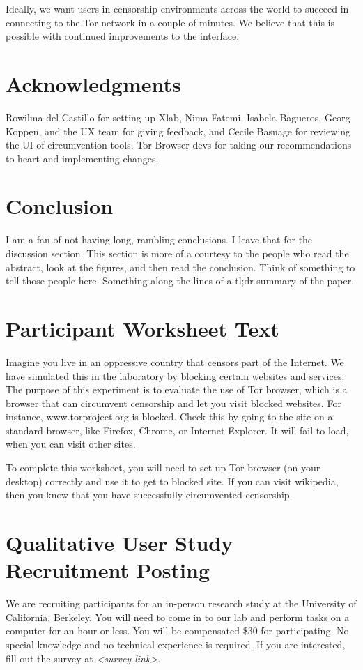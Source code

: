 \documentclass[USenglish,oneside,twocolumn]{article}
\begin{document}
Ideally, we want users in censorship environments across the world to succeed in connecting to the Tor network in a couple of minutes. We believe that this is possible with continued improvements to the interface. 

\section {Acknowledgments}
{\color {red} Rowilma del Castillo for setting up Xlab, Nima Fatemi, Isabela Bagueros, Georg Koppen, and the UX team for giving feedback, and Cecile Basnage for reviewing the UI of circumvention tools.} 
{\color {red} Tor Browser devs for taking our recommendations to heart and implementing changes.}

\section{Conclusion} 
{\color {red} I am a fan of not having long, rambling conclusions. I leave
that for the discussion section. This section is more of a courtesy to the 
people who read the abstract, look at the figures, and then read the 
conclusion. Think of something to tell those people here. Something along
the lines of a tl;dr summary of the paper.} 


\nocite{*}


\appendix
\section{Participant Worksheet Text} 
\label{participant-worksheet}
Imagine you live in an oppressive country that censors part of the Internet. We have simulated this in the laboratory by blocking certain websites and services. The purpose of this experiment is to evaluate the use of Tor browser, which is a browser that can circumvent censorship and let you visit blocked websites. For instance, www.torproject.org is blocked. Check this by going to the site on a standard browser, like Firefox, Chrome, or Internet Explorer. It will fail to load, when you can visit other sites.

To complete this worksheet, you will need to set up Tor browser (on your desktop) correctly and use it to get to blocked site. If you can visit wikipedia, then you know that you have successfully circumvented censorship.

\section{Qualitative User Study Recruitment Posting} 
\label{qualitative-recruitment}
We are recruiting participants for an in-person research study at the University of California, Berkeley. You will need to come in to our lab and perform tasks on a computer for an hour or less. You will be compensated \$30 for participating. 
No special knowledge and no technical experience is required. If you are interested, fill out the survey at \textit{<survey link>}. 
\end{document}
